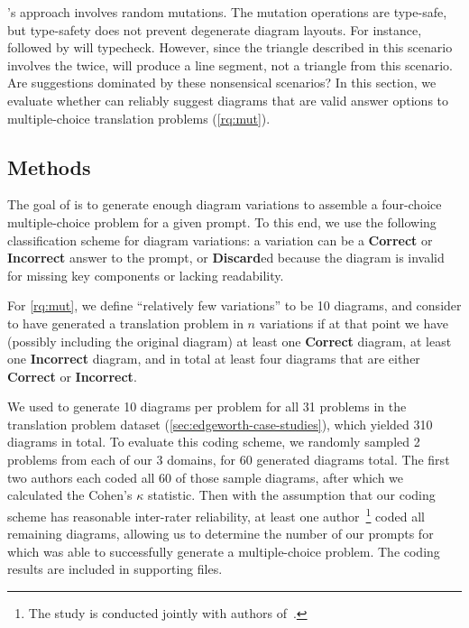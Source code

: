 \Edgeworth's approach involves random mutations. The mutation operations are type-safe, but type-safety does not prevent degenerate diagram layouts. For instance,  followed by  will typecheck. However, since the triangle described in this scenario involves the  twice, \Edgeworth will produce a line segment, not a triangle from this scenario. Are \Edgeworth suggestions dominated by these nonsensical scenarios? In this section, we evaluate whether \Edgeworth can reliably suggest diagrams that are valid answer options to multiple-choice translation problems (\ref{rq:mut}). 

\subsection{Methods}
\label{sec:reliability-method}

The goal of \Edgeworth is to generate enough diagram variations to assemble a four-choice multiple-choice problem for a given prompt. To this end, we use the following classification scheme for diagram variations: a variation can be a \textbf{Correct} or \textbf{Incorrect} answer to the prompt, or \textbf{Discard}ed because the diagram is invalid for missing key components or lacking readability.

For \ref{rq:mut}, we define ``relatively few variations'' to be 10 diagrams, and consider \Edgeworth to have generated a translation problem in $n$ variations if at that point we have (possibly including the original diagram) at least one \textbf{Correct} diagram, at least one \textbf{Incorrect} diagram, and in total at least four diagrams that are either \textbf{Correct} or \textbf{Incorrect}.

We used \Edgeworth to generate 10 diagrams per problem for all 31 problems in the translation problem dataset (\cref{sec:edgeworth-case-studies}), which yielded 310 diagrams in total. To evaluate this coding scheme, we randomly sampled 2 problems from each of our 3 domains, for 60 generated diagrams total. The first two authors each coded all 60 of those sample diagrams, after which we calculated the Cohen's $\kappa$ \cite{cohen1960coefficient} statistic. Then with the assumption that our coding scheme has reasonable inter-rater reliability, at least one author~\footnote{The study is conducted jointly with authors of~\citet{ni_edgeworth_2024}.} coded all remaining diagrams, allowing us to determine the number of our prompts for which \Edgeworth was able to successfully generate a multiple-choice problem. The coding results are included in supporting files.

